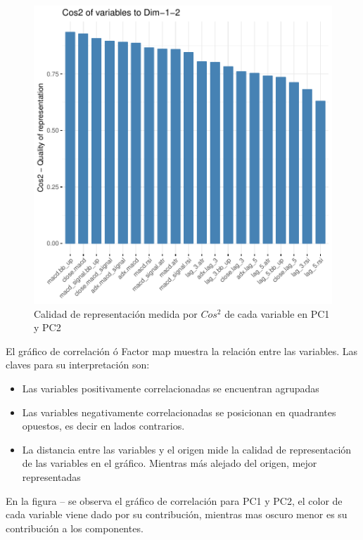 \documentclass[a4paper,12pt]{Latex/Classes/PhDthesisPSnPDF}
\begin{document}
\begin{figure}[H]
\centering
\includegraphics{main-010}
\caption{Calidad de representación medida por $Cos^2$ de cada variable en PC1 y PC2}
\end{figure}

El gráfico de correlación ó Factor map muestra la relación entre las variables. Las claves para su interpretación son:

\begin{itemize}
\item Las variables positivamente correlacionadas se encuentran agrupadas
\item Las variables negativamente correlacionadas se posicionan en quadrantes opuestos, es decir en lados contrarios.
\item La distancia entre las variables y el origen mide la calidad de representación de las variables en el gráfico. Mientras más alejado del origen, mejor representadas 
\end{itemize}

En la figura -- se observa el gráfico de correlación para PC1 y PC2, el color de cada variable viene dado por su contribución, mientras mas oscuro menor es su contribución a los componentes.
\end{document}
